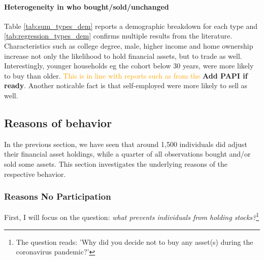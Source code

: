 \documentclass[ProjectABM]{subfiles}
\begin{document}
%



\paragraph{Heterogeneity in who bought/sold/unchanged}
Table \ref{tab:sum_types_dem} reports a demographic breakdown for each type and \ref{tab:regression_types_dem} confirms multiple results from the literature. Characteristics such as college degree, male, higher income and home ownership increase not only the likelihood to hold financial assets, but to trade as well. Interestingly, younger households eg the cohort below 30 years, were more likely to buy than older. \textcolor{orange}{This is in line with reports such as from the \cite{DAI_2021}} \textbf{Add PAPI if ready}. Another noticable fact is that self-employed were more likely to sell as well.






\subsection{Reasons of behavior}
In the previous section, we have seen that around 1,500 individuals did adjust their financial asset holdings, while a quarter of all observations bought and/or sold some assets. This section investigates the underlying reasons of the respective behavior.

\subsubsection{Reasons No Participation}
First, I will focus on the question: \textit{what prevents individuals from holding stocks?}\footnote{The question reads: 'Why did you decide not to buy any asset(s) during the coronavirus pandemic?'} 
\end{document}
